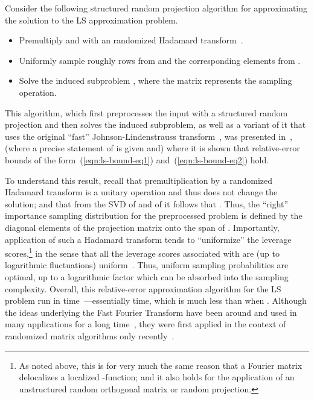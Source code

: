 \documentclass[twoside]{article}
\begin{document}
Consider the following structured random projection algorithm for 
approximating the solution to the LS approximation problem.
\begin{itemize}
\item
Premultiply  and  with an  randomized Hadamard 
transform~.
\item
Uniformly sample roughly 
 rows from 
 and the corresponding elements from .
\item
Solve the induced subproblem
, where the 
 matrix  represents the sampling operation.
\end{itemize}
This algorithm, which first preprocesses the input with a structured random 
projection and then solves the induced subproblem, as well as a variant 
of it that uses the original ``fast'' 
Johnson-Lindenstrauss transform~\cite{AC06,AC06-JRNL09,Matousek08_RSA}, was 
presented in~\cite{Sarlos06,DMMS07_FastL2_NM10}, (where a precise 
statement of  is given and) where it is shown that 
relative-error bounds of the form~(\ref{eqn:ls-bound-eq1}) 
and~(\ref{eqn:ls-bound-eq2}) hold.

To understand this result, recall that premultiplication by a randomized 
Hadamard transform is a unitary operation and thus does not change the 
solution; and that from the SVD of  and of  it follows that 
.
Thus, the ``right'' importance sampling distribution for the preprocessed 
problem is defined by the diagonal elements of the projection matrix onto 
the span of .
Importantly, application of such a Hadamard transform tends to 
``uniformize'' the leverage scores,\footnote{As noted above, this is for very much the same reason that a 
Fourier matrix delocalizes a localized -function; and it also holds 
for the application of an unstructured random orthogonal matrix or random 
projection.}
in the sense that all the leverage scores associated with  are (up 
to logarithmic fluctuations) uniform~\cite{AC06,DMMS07_FastL2_NM10}.
Thus, uniform sampling probabilities are optimal, up to a logarithmic factor 
which can be absorbed into the sampling complexity.
Overall, this relative-error approximation algorithm for the LS problem 
run in  time~\cite{Sarlos06,DMMS07_FastL2_NM10}---essentially 
 time, 
which is much less than  when .
Although the ideas underlying the Fast Fourier Transform have been around 
and used in many applications for a long time~\cite{CT65,GR87}, they were 
first applied in the context of randomized matrix algorithms only 
recently~\cite{AC06,Sarlos06,DMMS07_FastL2_NM10}.
\end{document}
